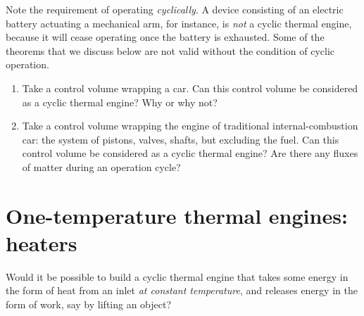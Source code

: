 \documentclass[a4paper,12pt,%
onecolumn,oneside,%
british%
]{memoir}
\renewcommand*{\|}[1][]{\nonscript\:#1\vert\nonscript\:\mathopen{}}
\begin{document}
Note the requirement of operating \emph{cyclically}. A device consisting of an electric battery actuating a mechanical arm, for instance, is \emph{not} a cyclic thermal engine, because it will cease operating once the battery is exhausted. Some of the theorems that we discuss below are not valid without the condition of cyclic operation.

\begin{exercise}
  \begin{enumerate}[exerc]
  \item Take a control volume wrapping a car. Can this control volume be considered as a cyclic thermal engine? Why or why not?
  \item Take a control volume wrapping the engine of traditional internal-combustion car: the system of pistons, valves, shafts, but excluding the fuel. Can this control volume be considered as a cyclic thermal engine? Are there any fluxes of matter during an operation cycle?
  \end{enumerate}
\end{exercise}


\section{One-temperature thermal engines: heaters}
\label{sec:heat_engine1}

Would it be possible to build a cyclic thermal engine that takes some energy in the form of heat from an inlet \emph{at constant temperature}, and releases energy in the form of work, say by lifting an object?
\end{document}
